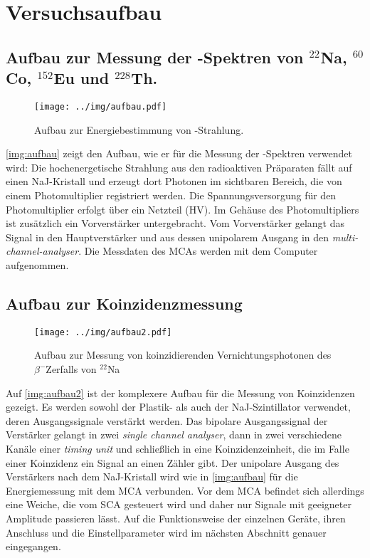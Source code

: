 \section{Versuchsaufbau}

\subsection{Aufbau zur Messung der \textgamma-Spektren von ${}^{22}$Na, ${}^{60}$Co, ${}^{152}$Eu und ${}^{228}$Th.}

\begin{figure}[H]
\begin{center}
  \texttt{[image: ../img/aufbau.pdf]}
  \caption[---]{Aufbau zur Energiebestimmung von \textgamma-Strahlung.}
  \label{img:aufbau}
\end{center}
\end{figure}

\autoref{img:aufbau} zeigt den Aufbau, wie er für die Messung der \textgamma-Spektren verwendet wird:
Die hochenergetische Strahlung aus den radioaktiven Präparaten fällt auf einen NaJ-Kristall und
erzeugt dort Photonen im sichtbaren Bereich, die von einem Photomultiplier registriert werden.
Die Spannungsversorgung für den Photomultiplier erfolgt über ein Netzteil (HV).
Im Gehäuse des Photomultipliers ist zusätzlich ein Vorverstärker untergebracht.
Vom Vorverstärker gelangt das Signal in den Hauptverstärker und aus dessen unipolarem Ausgang
in den \emph{multi-channel-analyser}.
Die Messdaten des MCAs werden mit dem Computer aufgenommen.


\subsection{Aufbau zur Koinzidenzmessung}

\begin{figure}[H]
\begin{center}
  \texttt{[image: ../img/aufbau2.pdf]}
  \caption[---]{Aufbau zur Messung von koinzidierenden Vernichtungsphotonen
  des $\beta^-$Zerfalls von ${}^{22}$Na}
  \label{img:aufbau2}
\end{center}
\end{figure}


Auf \autoref{img:aufbau2} ist der komplexere Aufbau für die Messung von Koinzidenzen gezeigt.
Es werden sowohl der Plastik- als auch der NaJ-Szintillator verwendet, deren Ausgangssignale
verstärkt werden.
Das bipolare Ausgangssignal der Verstärker gelangt in zwei \emph{single channel analyser},
dann in zwei verschiedene Kanäle einer \emph{timing unit} und schließlich in eine Koinzidenzeinheit,
die im Falle einer Koinzidenz ein Signal an einen Zähler gibt.
Der unipolare Ausgang des Verstärkers nach dem NaJ-Kristall wird wie in \autoref{img:aufbau}
für die Energiemessung mit dem MCA verbunden. Vor dem MCA befindet sich allerdings eine Weiche,
die vom SCA gesteuert wird und daher nur Signale mit geeigneter Amplitude passieren lässt.
Auf die Funktionsweise der einzelnen Geräte, ihren Anschluss und die Einstellparameter
wird im nächsten Abschnitt genauer eingegangen.



